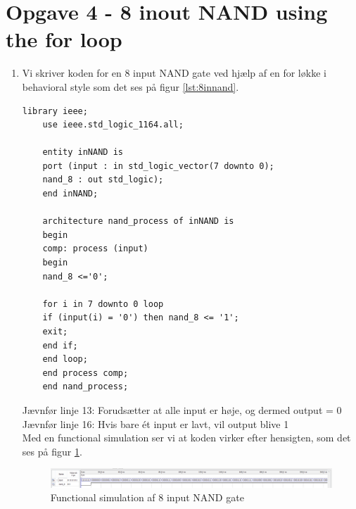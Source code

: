 \section{Opgave 4 - 8 inout NAND using the for loop}
\begin{enumerate}
	\item[1)]
	Vi skriver koden for en 8 input NAND gate ved hjælp af en for løkke i behavioral style som det ses på figur \ref{lst:8innand}.\\
	\begin{lstlisting}[caption={Behavioral style kode for en 8 input NAND gate},label={lst:8innand}]
	library ieee;
	use ieee.std_logic_1164.all;
	
	entity inNAND is
	port (input : in std_logic_vector(7 downto 0);
	nand_8 : out std_logic);
	end inNAND;
	
	architecture nand_process of inNAND is
	begin
	comp: process (input)
	begin
	nand_8 <='0';
	
	for i in 7 downto 0 loop
	if (input(i) = '0') then nand_8 <= '1'; 
	exit;
	end if;
	end loop;
	end process comp;
	end nand_process;
	\end{lstlisting}
	Jævnfør linje 13: Forudsætter at alle input er høje, og dermed output = 0\\
	Jævnfør linje 16: Hvis bare ét input er lavt, vil output blive 1\\
	\clearpage
	Med en functional simulation ser vi at koden virker efter hensigten, som det ses på figur \ref{fig:8innand}.\\
	\begin{figure}[h]
		\centering
		\includegraphics[scale=0.4]{pictures/Oevelse5/opg4/func_sim_8nand.JPG}
		\caption{Functional simulation af 8 input NAND gate}
		\label{fig:8innand}
	\end{figure}
\end{enumerate}